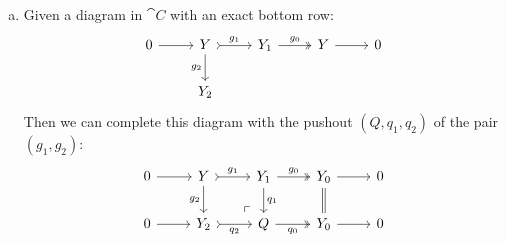 \begin{theorem}
\begin{enumerate}[(a)]
        \item Given a diagram in \(\cat C\) with an exact bottom row:
              \[
                  \begin{tikzcd}
                      0 \ar[r]
                      &Y \ar[r, tail, "g_1"] \ar[d, "g_2"']
                      &Y_1 \ar[r, two heads, "g_0"]
                      &Y \ar[r]
                      &0
                      \\
                      &Y_2 & & &
                  \end{tikzcd}
              \]
              Then we can complete this diagram with the pushout \((Q, q_1, q_2)\) of the
              pair \((g_1, g_2)\):
              \[
                  \begin{tikzcd}
                      0 \ar[r]
                      &Y \ar[d, "g_2"']
                      \ar[r, "g_1", tail]
                      &Y_1
                      \ar[r, "g_0", two heads]
                      \ar[d, "q_1"]
                      &Y_0
                      \ar[d, equals]
                      \ar[r]
                      &0
                      \\
                      0 \ar[r]
                      &Y_2 \ar[r, tail, "q_2"']
                      &Q \ar[r, two heads, "q_0"']
                      \ar[ul, "\ulcorner", phantom, very near start]
                      &Y_0 \ar[r]
                      &0
                  \end{tikzcd}
              \]


\end{enumerate}
\end{theorem}
